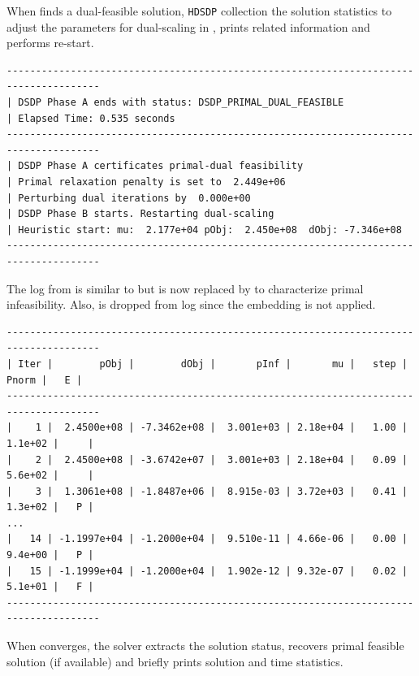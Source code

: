 When  finds a dual-feasible solution, {{\texttt{HDSDP}}}
collection the solution statistics to adjust the parameters for
dual-scaling in , prints related information and performs re-start.

\begin{lstlisting}
--------------------------------------------------------------------------------------
| DSDP Phase A ends with status: DSDP_PRIMAL_DUAL_FEASIBLE                                         
| Elapsed Time: 0.535 seconds                                                                   
--------------------------------------------------------------------------------------
| DSDP Phase A certificates primal-dual feasibility                                                
| Primal relaxation penalty is set to  2.449e+06 
| Perturbing dual iterations by  0.000e+00 
| DSDP Phase B starts. Restarting dual-scaling                                                     
| Heuristic start: mu:  2.177e+04 pObj:  2.450e+08  dObj: -7.346e+08                              
--------------------------------------------------------------------------------------
\end{lstlisting}	

The log from  is similar to  but
 is now replaced by  to characterize primal
infeasibility. Also,  is dropped from log since the embedding
is not applied.

\begin{lstlisting}
--------------------------------------------------------------------------------------
| Iter |        pObj |        dObj |       pInf |       mu |   step |    Pnorm |   E |
--------------------------------------------------------------------------------------
|    1 |  2.4500e+08 | -7.3462e+08 |  3.001e+03 | 2.18e+04 |   1.00 |  1.1e+02 |     |
|    2 |  2.4500e+08 | -3.6742e+07 |  3.001e+03 | 2.18e+04 |   0.09 |  5.6e+02 |     |
|    3 |  1.3061e+08 | -1.8487e+06 |  8.915e-03 | 3.72e+03 |   0.41 |  1.3e+02 |   P |
...
|   14 | -1.1997e+04 | -1.2000e+04 |  9.510e-11 | 4.66e-06 |   0.00 |  9.4e+00 |   P |
|   15 | -1.1999e+04 | -1.2000e+04 |  1.902e-12 | 9.32e-07 |   0.02 |  5.1e+01 |   F |
--------------------------------------------------------------------------------------
\end{lstlisting}

When  converges, the solver extracts the solution status,
recovers primal feasible solution (if available) and briefly prints solution
and time statistics.

